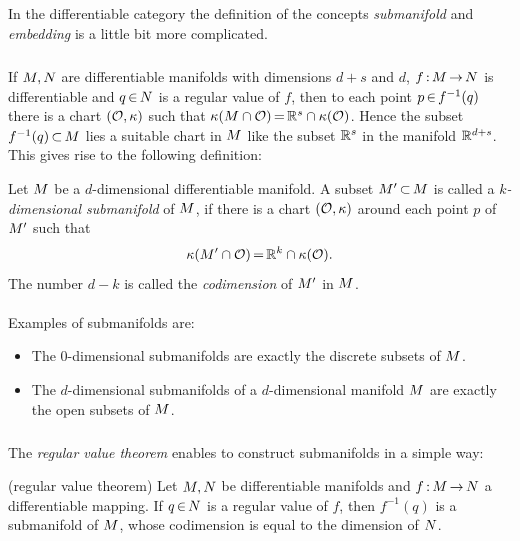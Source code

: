 \documentclass[11pt,twoside]{article}
\begin{document}
\subparagraph{}
In the differentiable category the definition of the concepts
\textit{submanifold} and \textit{embedding} is a little bit more complicated.

\subparagraph{}
If ${M},{N}$ are differentiable manifolds with dimensions $d+s$ and $d$,
$f{\,:\,} {M} {\,\to\,} {N}$ is differentiable
and $q {\,\in\,} {N}$ is a regular value of $f$,
then to each point $p {\,\in\,} f^{-1}(q)$ there is a chart $(\mathcal{O},\kappa)$
such that
$\kappa({M} \cap \mathcal{O}) {\,=\,} {\mathbb{R}}^s \cap \kappa(\mathcal{O})$.
Hence the subset $f^{-1}(q) {\,\subset\,} {M}$ lies {\wrt} a suitable chart
in ${M}$ like the subset ${\mathbb{R}}^s$ in the manifold ${\mathbb{R}}^{d+s}$.
This gives rise to the following definition:

\begin{definition}
Let ${M}$ be a $d$-dimensional differentiable manifold.
A subset ${M}' {\,\subset\,} {M}$ is called
a \textit{$k$-dimensional submanifold} of ${M}$,
if there is a chart $(\mathcal{O},\kappa)$ around each point $p$ of ${M}'$
such that
\[
\kappa({M}' \cap \mathcal{O}) {\,=\,} {\mathbb{R}}^k \cap \kappa(\mathcal{O}).
\]
The number $d-k$ is called the \textit{codimension} of ${M}'$ in ${M}$.
\end{definition}

\paragraph{}
Examples of submanifolds are:

\begin{itemize}[leftmargin=15pt]
\item[1.]
The $0$-dimensional submanifolds are exactly the discrete subsets of ${M}$.

\item[2.]
The $d$-dimensional submanifolds of a $d$-dimensional
manifold ${M}$ are exactly the open subsets of ${M}$.
\end{itemize}

\subparagraph{}
The \textit{regular value theorem} enables to construct submanifolds
in a simple way:

\begin{theorem} (regular value theorem)
Let ${M},{N}$ be differentiable manifolds
and $f{\,:\,} {M} {\,\to\,} {N}$ a differentiable mapping.
If $q {\,\in\,} {N}$ is a regular value of $f$,
then $f^{-1}(q)$ is a submanifold of ${M}$,
whose codimension is equal to the dimension of ${N}$.
\end{theorem}
\end{document}
